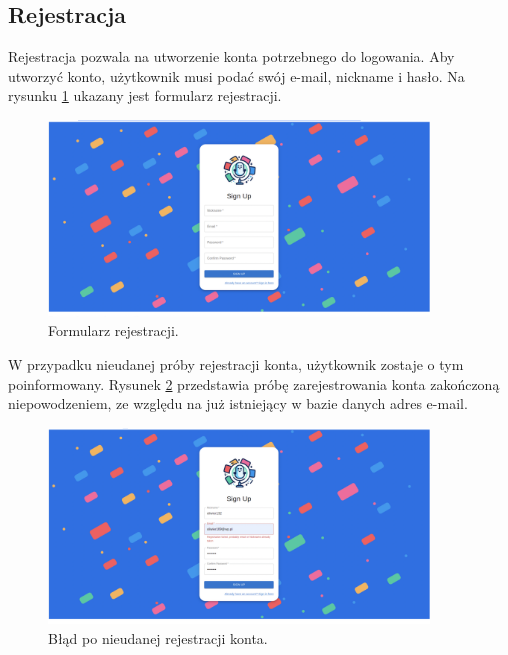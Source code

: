 \subsection{Rejestracja}
Rejestracja pozwala na utworzenie konta potrzebnego do logowania. Aby utworzyć konto, użytkownik musi podać swój e-mail, nickname i hasło. Na rysunku \ref{img:web_register} ukazany jest formularz rejestracji.


\begin{figure}[H]
    \centering
    \includegraphics[width=0.9\textwidth]{chapters/chapter_10/images_web/web_register}
    \caption{Formularz rejestracji.}
    \label{img:web_register}
\end{figure}

W przypadku nieudanej próby rejestracji konta, użytkownik zostaje o tym poinformowany. Rysunek \ref{img:web_register_2} przedstawia próbę zarejestrowania konta zakończoną niepowodzeniem, ze względu na już istniejący w bazie danych adres e-mail.

\begin{figure}[H]
    \centering
    \includegraphics[width=0.9\textwidth]{chapters/chapter_10/images_web/web_register_2}
    \caption{Błąd po nieudanej rejestracji konta.}
    \label{img:web_register_2}
\end{figure}


